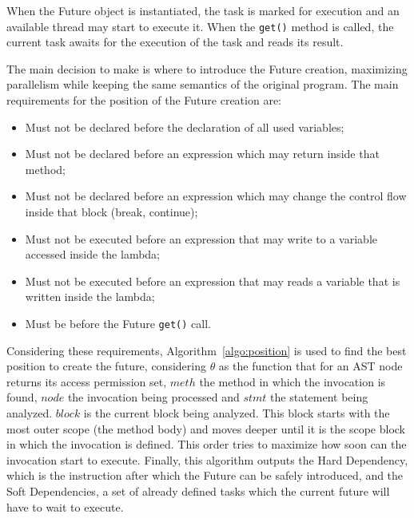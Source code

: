 \documentclass[smallextended]{svjour3}
\begin{document}
When the Future object is instantiated, the task is marked for execution and an available thread may start to execute it. When the \verb|get()| method is called, the current task awaits for the execution of the task and reads its result.

The main decision to make is where to introduce the Future creation, maximizing parallelism while keeping the same semantics of the original program. The main requirements for the position of the Future creation are:

\begin{itemize}
    \item Must not be declared before the declaration of all used variables;
    \item Must not be declared before an expression which may return inside that method;
    \item Must not be declared before an expression which may change the control flow inside that block (break, continue);
    \item Must not be executed before an expression that may write to a variable accessed inside the lambda;
    \item Must not be executed before an expression that may reads a variable that is written inside the lambda;
    \item Must be before the Future \verb|get()| call.
\end{itemize}

Considering these requirements, Algorithm~\ref{algo:position} is used to find the best position to create the future, considering $\theta$ as the function that for an AST node returns its access permission set, $meth$ the method in which the invocation is found, $node$ the invocation being processed and $stmt$ the statement being analyzed. $block$ is the current block being analyzed. This block starts with the most outer scope (the method body) and moves deeper until it is the scope block in which the invocation is defined. This order tries to maximize how soon can the invocation start to execute. Finally, this algorithm outputs the Hard Dependency, which is the instruction after which the Future can be safely introduced, and the Soft Dependencies, a set of already defined tasks which the current future will have to wait to execute.
\end{document}
